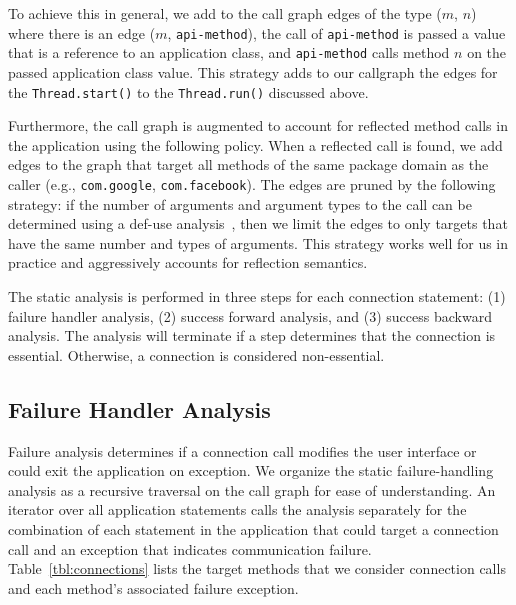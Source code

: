 To achieve this in general, we add to the call graph edges of the type
($m$, $n$) where there is an edge ($m$, \lstinline!api-method!), the
call of \lstinline!api-method! is passed a value that is a reference
to an application class, and \lstinline!api-method! calls method $n$
on the passed application class value.  This strategy adds to our
callgraph the edges for the \lstinline!Thread.start()! to the
\lstinline!Thread.run()! discussed above.

Furthermore, the call graph is augmented to account for reflected
method calls in the application using the following policy.  When a
reflected call is found, we add edges to the graph that target all
methods of the same package domain as the caller (e.g.,
\lstinline!com.google!, \lstinline!com.facebook!).  The edges are pruned by the
following strategy: if the number of arguments and argument types to
the call can be determined using a def-use analysis~\cite{Aho2006},
then we limit the edges to only targets that have the same number and
types of arguments.  This strategy works well for us in
practice and aggressively accounts for reflection semantics.

The static analysis is performed in three steps for each connection
statement: (1) failure handler analysis, (2) success forward analysis,
and (3) success backward analysis.  The analysis will terminate if a
step determines that the connection is essential. Otherwise, a
connection is considered non-essential.

\subsection{Failure Handler Analysis}

Failure analysis determines if a connection call modifies the user
interface or could exit the application on exception.  We organize the
static failure-handling analysis as a recursive traversal on the call
graph for ease of understanding.  An iterator over all application
statements calls the analysis separately for the combination of each
statement in the application that could target a connection call and
an exception that indicates communication failure.
Table~\ref{tbl:connections} lists the target methods that we consider
connection calls and each method's associated failure exception.

